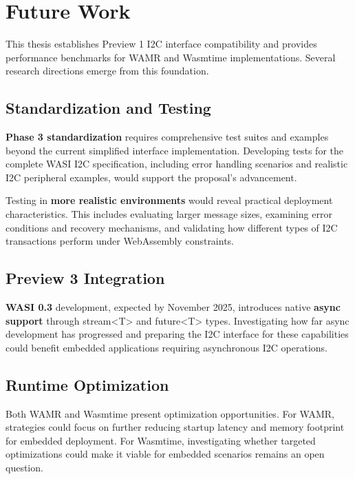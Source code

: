 \chapter*{Future Work}
\label{chap:future-work}

This thesis establishes Preview 1 I2C interface compatibility and provides performance benchmarks for WAMR and Wasmtime implementations. Several research directions emerge from this foundation.

\section*{Standardization and Testing}
\label{sec:standardization-testing}

\textbf{Phase 3 standardization} requires comprehensive test suites and examples beyond the current simplified interface implementation. Developing tests for the complete WASI I2C specification, including error handling scenarios and realistic I2C peripheral examples, would support the proposal's advancement.

Testing in \textbf{more realistic environments} would reveal practical deployment characteristics. This includes evaluating larger message sizes, examining error conditions and recovery mechanisms, and validating how different types of I2C transactions perform under WebAssembly constraints.

\section*{Preview 3 Integration}
\label{sec:preview3-integration}

\textbf{WASI 0.3} development, expected by November 2025, introduces native \textbf{async support} through stream<T> and future<T> types. Investigating how far async development has progressed and preparing the I2C interface for these capabilities could benefit embedded applications requiring asynchronous I2C operations.

\section*{Runtime Optimization}
\label{sec:runtime-optimization}

Both WAMR and Wasmtime present optimization opportunities. For WAMR, strategies could focus on further reducing startup latency and memory footprint for embedded deployment. For Wasmtime, investigating whether targeted optimizations could make it viable for embedded scenarios remains an open question.

